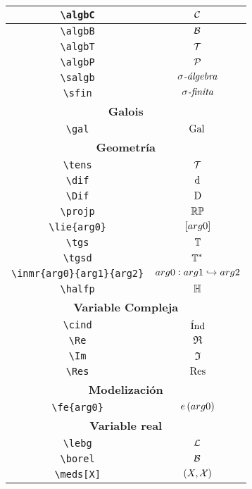 \begin{longtable}{|c|c|}
\verb|\algbC| & $\displaystyle\algbC$ \\ \hline 
\verb|\algbB| & $\displaystyle\algbB$ \\ \hline 
\verb|\algbT| & $\displaystyle\algbT$ \\ \hline 
\verb|\algbP| & $\displaystyle\algbP$ \\ \hline 
\verb|\salgb| & $\displaystyle\salgb$ \\ \hline 
\verb|\sfin| & $\displaystyle\sfin$ \\ \hline 
\multicolumn{2}{|c|}{\textbf{Galois}} \\ \hline 
\verb|\gal| & $\displaystyle\gal$ \\ \hline 
\multicolumn{2}{|c|}{\textbf{Geometría}} \\ \hline 
\verb|\tens| & $\displaystyle\tens$ \\ \hline 
\verb|\dif| & $\displaystyle\dif$ \\ \hline 
\verb|\Dif| & $\displaystyle\Dif$ \\ \hline 
\verb|\projp| & $\displaystyle\projp$ \\ \hline 
\verb|\lie{arg0}| & $\displaystyle\lie{arg0}$ \\ \hline 
\verb|\tgs| & $\displaystyle\tgs$ \\ \hline 
\verb|\tgsd| & $\displaystyle\tgsd$ \\ \hline 
\verb|\inmr{arg0}{arg1}{arg2}| & $\displaystyle\inmr{arg0}{arg1}{arg2}$ \\ \hline 
\verb|\halfp| & $\displaystyle\halfp$ \\ \hline 
\multicolumn{2}{|c|}{\textbf{Variable Compleja}} \\ \hline 
\verb|\cind| & $\displaystyle\cind$ \\ \hline 
\verb|\Re| & $\displaystyle\Re$ \\ \hline 
\verb|\Im| & $\displaystyle\Im$ \\ \hline 
\verb|\Res| & $\displaystyle\Res$ \\ \hline 
\multicolumn{2}{|c|}{\textbf{Modelización}} \\ \hline 
\verb|\fe{arg0}| & $\displaystyle\fe{arg0}$ \\ \hline 
\multicolumn{2}{|c|}{\textbf{Variable real}} \\ \hline 
\verb|\lebg| & $\displaystyle\lebg$ \\ \hline 
\verb|\borel| & $\displaystyle\borel$ \\ \hline 
\verb|\meds[X]| & $\displaystyle\meds[X]$ \\ \hline 

\end{longtable}
